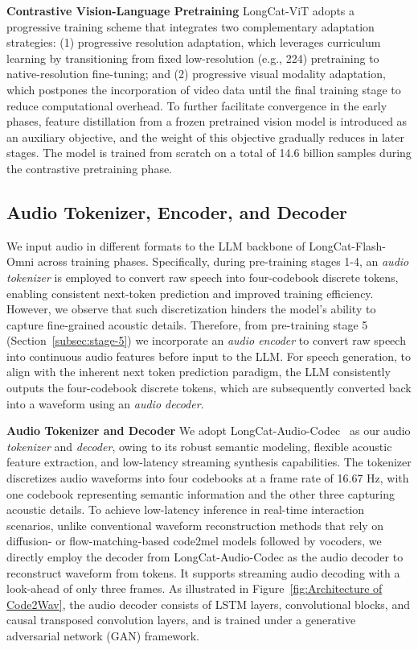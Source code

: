 \documentclass{article}
\newcommand{\longcat}{LongCat-Flash-Omni\xspace}
\begin{document}
\textbf{Contrastive Vision-Language Pretraining} 
LongCat-ViT adopts a progressive training scheme that integrates two complementary adaptation strategies: (1) progressive resolution adaptation, which leverages curriculum learning by transitioning from fixed low-resolution (e.g., 224) pretraining to native-resolution fine-tuning; and (2) progressive visual modality adaptation, which postpones the incorporation of video data until the final training stage to reduce computational overhead. To further facilitate convergence in the early phases, feature distillation from a frozen pretrained vision model is introduced as an auxiliary objective, and the weight of this objective gradually reduces in later stages. The model is trained from scratch on a total of 14.6 billion samples during the contrastive pretraining phase.


\subsection{Audio Tokenizer, Encoder, and Decoder} %
\label{sec:audio}

We input audio in different formats to the LLM backbone of \longcat across training phases. Specifically, during pre-training stages 1-4, an \textit{audio tokenizer} is employed to convert raw speech into four-codebook discrete tokens, enabling consistent next-token prediction and improved training efficiency.
However, we observe that such discretization hinders the model’s ability to capture fine-grained acoustic details. Therefore, from pre-training stage 5 (Section~\ref{subsec:stage-5}) we incorporate an \textit{audio encoder} to convert raw speech into continuous audio features before input to the LLM.
For speech generation, to align with the inherent next token prediction paradigm, the LLM consistently outputs the four-codebook discrete tokens, which are subsequently converted back into a waveform using an \textit{audio decoder}.

\textbf{Audio Tokenizer and Decoder} We adopt LongCat-Audio-Codec~\citep{longcat-codec2025zhao} as our audio \textit{tokenizer} and \textit{decoder}, owing to its robust semantic modeling, flexible acoustic feature extraction, and low-latency streaming synthesis capabilities. The tokenizer discretizes audio waveforms into four codebooks at a frame rate of 16.67 Hz, with one codebook representing semantic information and the other three capturing acoustic details.
To achieve low-latency inference in real-time interaction scenarios, unlike conventional waveform reconstruction methods that rely on diffusion- or flow-matching-based code2mel models followed by vocoders, we directly employ the decoder from LongCat-Audio-Codec as the audio decoder to reconstruct waveform from tokens. 
It supports streaming audio decoding with a look-ahead of only three frames. 
As illustrated in Figure~\ref{fig:Architecture of Code2Wav}, the audio decoder consists of LSTM layers, convolutional blocks, and causal transposed convolution layers, and is trained under a generative adversarial network (GAN) framework.
\end{document}
